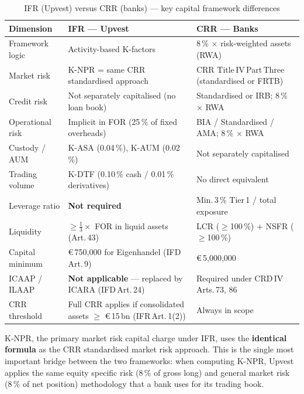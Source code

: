 \documentclass[12pt,a4paper]{report}
\newcommand{\eur}{\euro\,}
\begin{document}
\begin{table}[H]
\caption{IFR (Upvest) versus CRR (banks) --- key capital framework differences}
\label{tab:ifrvcrr}
\small
\begin{tabularx}{\textwidth}{@{}L{3.2cm}XX@{}}
\toprule
\textbf{Dimension} & \textbf{IFR --- Upvest} & \textbf{CRR --- Banks} \\
\midrule
Framework logic & Activity-based K-factors & 8\,\% $\times$ risk-weighted assets (RWA) \\[3pt]
Market risk & K-NPR = same CRR standardised approach & CRR Title\,IV\,Part\,Three (standardised or FRTB) \\[3pt]
Credit risk & Not separately capitalised (no loan book) & Standardised or IRB; 8\,\% $\times$ RWA \\[3pt]
Operational risk & Implicit in FOR (25\,\% of fixed overheads) & BIA / Standardised / AMA; 8\,\% $\times$ RWA \\[3pt]
Custody / AUM & K-ASA (0.04\,\%), K-AUM (0.02\,\%) & Not separately capitalised \\[3pt]
Trading volume & K-DTF (0.10\,\% cash / 0.01\,\% derivatives) & No direct equivalent \\[3pt]
Leverage ratio & \textbf{Not required} & Min.\,3\,\% Tier\,1 / total exposure \\[3pt]
Liquidity & $\geq \tfrac{1}{3} \times$ FOR in liquid assets (Art.\,43) & LCR ($\geq$100\,\%) + NSFR ($\geq$100\,\%) \\[3pt]
Capital minimum & \eur{}750{,}000 for Eigenhandel (IFD\,Art.\,9) & \eur{}5{,}000{,}000 \\[3pt]
ICAAP / ILAAP & \textbf{Not applicable} --- replaced by ICARA (IFD\,Art.\,24) & Required under CRD\,IV\,Arts.\,73, 86 \\[3pt]
CRR threshold & Full CRR applies if consolidated assets $\geq$ \eur{}15\,bn (IFR\,Art.\,1(2)) & Always in scope \\
\bottomrule
\end{tabularx}
\end{table}

\begin{regbox}
K-NPR, the primary market risk capital charge under IFR, uses the \textbf{identical
formula} as the CRR standardised market risk approach. This is the single most important
bridge between the two frameworks: when computing K-NPR, Upvest applies the same equity
specific risk (8\,\% of gross long) and general market risk (8\,\% of net position)
methodology that a bank uses for its trading book.
\end{regbox}
\end{document}
